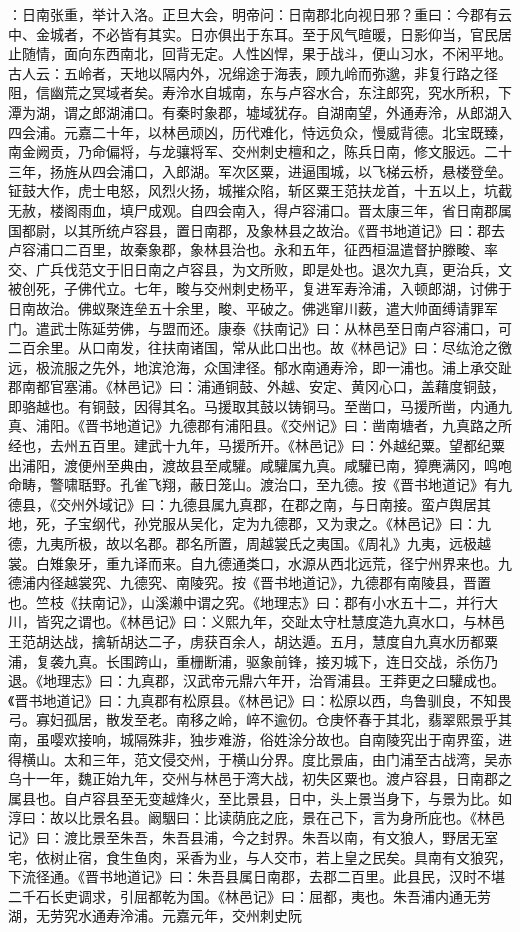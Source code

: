 \documentclass[12pt,UTF8]{ctexbook}
\begin{document}
：日南张重，举计入洛。正旦大会，明帝问：日南郡北向视日邪？重曰：今郡有云中、金城者，不必皆有其实。日亦俱出于东耳。至于风气暄暖，日影仰当，官民居止随情，面向东西南北，回背无定。人性凶悍，果于战斗，便山习水，不闲平地。古人云：五岭者，天地以隔内外，况绵途于海表，顾九岭而弥邈，非复行路之径阻，信幽荒之冥域者矣。寿泠水自城南，东与卢容水合，东注郎究，究水所积，下潭为湖，谓之郎湖浦口。有秦时象郡，墟域犹存。自湖南望，外通寿泠，从郎湖入四会浦。元嘉二十年，以林邑顽凶，历代难化，恃远负众，慢威背德。北宝既臻，南金阙贡，乃命偏将，与龙骧将军、交州刺史檀和之，陈兵日南，修文服远。二十三年，扬旌从四会浦口，入郎湖。军次区粟，进逼围城，以飞梯云桥，悬楼登垒。钲鼓大作，虎士电怒，风烈火扬，城摧众陷，斩区粟王范扶龙首，十五以上，坑截无赦，楼阁雨血，填尸成观。自四会南入，得卢容浦口。晋太康三年，省日南郡属国都尉，以其所统卢容县，置日南郡，及象林县之故治。《晋书地道记》曰：郡去卢容浦口二百里，故秦象郡，象林县治也。永和五年，征西桓温遣督护滕畯、率交、广兵伐范文于旧日南之卢容县，为文所败，即是处也。退次九真，更治兵，文被创死，子佛代立。七年，畯与交州刺史杨平，复进军寿泠浦，入顿郎湖，讨佛于日南故治。佛蚁聚连垒五十余里，畯、平破之。佛逃窜川薮，遣大帅面缚请罪军门。遣武士陈延劳佛，与盟而还。康泰《扶南记》曰：从林邑至日南卢容浦口，可二百余里。从口南发，往扶南诸国，常从此口出也。故《林邑记》曰：尽纮沧之徼远，极流服之先外，地滨沧海，众国津径。郁水南通寿泠，即一浦也。浦上承交趾郡南都官塞浦。《林邑记》曰：浦通铜鼓、外越、安定、黄冈心口，盖藉度铜鼓，即骆越也。有铜鼓，因得其名。马援取其鼓以铸铜马。至凿口，马援所凿，内通九真、浦阳。《晋书地道记》九德郡有浦阳县。《交州记》曰：凿南塘者，九真路之所经也，去州五百里。建武十九年，马援所开。《林邑记》曰：外越纪粟。望都纪粟出浦阳，渡便州至典由，渡故县至咸驩。咸驩属九真。咸驩已南，獐麂满冈，鸣咆命畴，警啸聒野。孔雀飞翔，蔽日笼山。渡治口，至九德。按《晋书地道记》有九德县，《交州外域记》曰：九德县属九真郡，在郡之南，与日南接。蛮卢舆居其地，死，子宝纲代，孙党服从吴化，定为九德郡，又为隶之。《林邑记》曰：九德，九夷所极，故以名郡。郡名所置，周越裳氏之夷国。《周礼》九夷，远极越裳。白雉象牙，重九译而来。自九德通类口，水源从西北远荒，径宁州界来也。九德浦内径越裳究、九德究、南陵究。按《晋书地道记》，九德郡有南陵县，晋置也。竺枝《扶南记》，山溪濑中谓之究。《地理志》曰：郡有小水五十二，并行大川，皆究之谓也。《林邑记》曰：义熙九年，交趾太守杜慧度造九真水口，与林邑王范胡达战，擒斩胡达二子，虏获百余人，胡达遁。五月，慧度自九真水历都粟浦，复袭九真。长围跨山，重栅断浦，驱象前锋，接刃城下，连日交战，杀伤乃退。《地理志》曰：九真郡，汉武帝元鼎六年开，治胥浦县。王莽更之曰驩成也。《晋书地道记》曰：九真郡有松原县。《林邑记》曰：松原以西，鸟鲁驯良，不知畏弓。寡妇孤居，散发至老。南移之岭，崪不逾仞。仓庚怀春于其北，翡翠熙景乎其南，虽嘤欢接响，城隔殊非，独步难游，俗姓涂分故也。自南陵究出于南界蛮，进得横山。太和三年，范文侵交州，于横山分界。度比景庙，由门浦至古战湾，吴赤乌十一年，魏正始九年，交州与林邑于湾大战，初失区粟也。渡卢容县，日南郡之属县也。自卢容县至无变越烽火，至比景县，日中，头上景当身下，与景为比。如淳曰：故以比景名县。阚駰曰：比读荫庇之庇，景在己下，言为身所庇也。《林邑记》曰：渡比景至朱吾，朱吾县浦，今之封界。朱吾以南，有文狼人，野居无室宅，依树止宿，食生鱼肉，采香为业，与人交市，若上皇之民矣。具南有文狼究，下流径通。《晋书地道记》曰：朱吾县属日南郡，去郡二百里。此县民，汉时不堪二千石长吏调求，引屈都乾为国。《林邑记》曰：屈都，夷也。朱吾浦内通无劳湖，无劳究水通寿泠浦。元嘉元年，交州刺史阮
\end{document}
